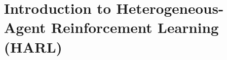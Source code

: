 \section{Introduction to Heterogeneous-Agent Reinforcement Learning (HARL)}
\clearpage
\begin{comment}
3.2 Advances in MARL
The advancement of MARL includes the development of algorithms that allow agents to learn in environments with other learning agents, leading to applications in fields such as robotics, game theory, and economics.
	•	Key Paper: Busoniu, L., Babuska, R., & De Schutter, B. (2008). A comprehensive survey of multi-agent reinforcement learning.
	•	Key Paper: Mnih, V. et al. (2015). Human-level control through deep reinforcement learning.
	•	Key Paper: Silver, D. et al. (2017). Mastering the game of Go without human knowledge.
4. HARL
4.1 Definition and Significance
HARL extends MARL by allowing agents with different capabilities and knowledge to interact. This heterogeneity mirrors real-world scenarios more closely, where agents (e.g., robots, drones) often have diverse functionalities.
	•	Key Paper: Lowe, R. et al. (2017). Multi-Agent Actor-Critic for Mixed Cooperative-Competitive Environments.
4.2 Applications of HARL
HARL has been applied in various domains such as autonomous driving, smart grids, and collaborative robotics, demonstrating its potential to solve complex, real-world problems.
	•	Key Paper: Kraemer, L., & Banerjee, B. (2020). Multi-agent reinforcement learning as a rehearsal for decentralized planning.
5. \section{Current State of the Art in HARL}
5.1 Recent Advances
Recent research has focused on enhancing the efficiency, scalability, and robustness of HARL algorithms. Significant contributions include the development of new learning paradigms and the application of HARL in increasingly complex environments.
	•	Key Paper: Zhou, Y. et al. (2023). The role of hierarchy in multi-agent learning.
	•	Key Paper: Yang, Y. et al. (2023). Efficient policy learning in large-scale heterogeneous-agent environments.
5.2 Addressing Strategic Collapse
One critical challenge in HARL is the risk of strategic collapse, where agents’ strategies become suboptimal when scaling up the number of agents or increasing environmental complexity. Addressing this issue is crucial for the practical deployment of HARL systems.
	•	Key Paper: Papoudakis, G. et al. (2021). Benchmarking Multi-Agent Deep Reinforcement Learning Algorithms.

\end{comment}
